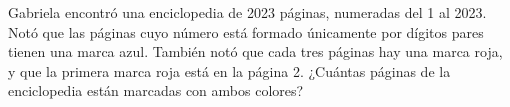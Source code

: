 Gabriela encontró una enciclopedia de 2023 páginas, numeradas del 1 al 2023. Notó que las páginas cuyo número está formado únicamente por dígitos pares tienen una marca azul. También notó que cada tres páginas hay una marca roja, y que la primera marca roja está en la página 2. ¿Cuántas páginas de la enciclopedia están marcadas con ambos colores?
